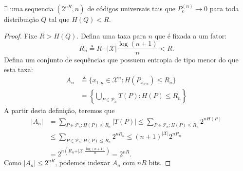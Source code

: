 \begin{theorem}\label{thm:teocodshannontipos}
$\exists$ uma sequencia $(2^{nR},n)$ de códigos universais tais que $P_e^{(n)} \rightarrow 0$ para toda
distribuição $Q$ tal que $H(Q) < R$.
\end{theorem}
\begin{proof}
  Fixe $R > H(Q)$. Defina uma taxa para $n$ que é fixada a um fator:
  \begin{equation}
    R_n \triangleq R - \vert \mathcal{X} \vert \frac{\log (n+1)}{n} < R .
  \end{equation}
  Defina um conjunto de sequências que possuem entropia de tipo menor do que esta taxa:
  \begin{subequations}
    \begin{align}
       A_n &\triangleq \{ x_{1:n} \in \mathcal{X}^n : H(P_{x_{1:n}}) \leq R_n \} \\
           &= \left\{  \bigcup_{P \in \mathcal{P}_n} T(P) : H(P) \leq R_n \right\}
    \end{align}
  \end{subequations}
  A partir desta definição, teremos que
  \begin{subequations}
  \begin{align}
    \vert A_n \vert &= \sum_{P \in \mathcal{P}_n : H(P) \leq R_n} \vert T(P) \vert \leq \sum_{P \in \mathcal{P}_n : H(P) \leq R_n} 2^{nH(P)} \\
                    &\leq \sum_{P \in \mathcal{P}_n : H(P) \leq R_n} 2^{nR_n} \leq (n+1)^{\vert \mathcal{X} \vert} 2^{nR_n} \\
                    &= 2^{n \left( R_n + \vert \mathcal{X} \vert \frac{\log (n+1)}{n} \right)} = 2^{nR} .
  \end{align}
  \end{subequations}
  Como $\vert A_n \vert \leq 2^{nR}$, podemos indexar $A_n$ com $nR$ bits.


\end{proof}

